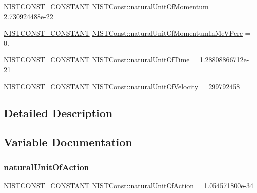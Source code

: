 \begin{DoxyCompactItemize}
\item 
\mbox{\hyperlink{group___n_i_s_t_const-_macros_ga2b0fc1d7452373f816175dd86ce26729}{N\+I\+S\+T\+C\+O\+N\+S\+T\+\_\+\+C\+O\+N\+S\+T\+A\+NT}} \mbox{\hyperlink{group___n_i_s_t_const-_natural_unit_ga020a191050aee0f8de449b86901efcab}{N\+I\+S\+T\+Const\+::natural\+Unit\+Of\+Momentum}} = 2.\+730924488e-\/22
\item 
\mbox{\hyperlink{group___n_i_s_t_const-_macros_ga2b0fc1d7452373f816175dd86ce26729}{N\+I\+S\+T\+C\+O\+N\+S\+T\+\_\+\+C\+O\+N\+S\+T\+A\+NT}} \mbox{\hyperlink{group___n_i_s_t_const-_natural_unit_ga1768d322c0f9342d6fb5a30d1158a6ca}{N\+I\+S\+T\+Const\+::natural\+Unit\+Of\+Momentum\+In\+Me\+V\+Perc}} = 0.
\item 
\mbox{\hyperlink{group___n_i_s_t_const-_macros_ga2b0fc1d7452373f816175dd86ce26729}{N\+I\+S\+T\+C\+O\+N\+S\+T\+\_\+\+C\+O\+N\+S\+T\+A\+NT}} \mbox{\hyperlink{group___n_i_s_t_const-_natural_unit_gab65c3f69b157abb96800734bdc63f25d}{N\+I\+S\+T\+Const\+::natural\+Unit\+Of\+Time}} = 1.\+28808866712e-\/21
\item 
\mbox{\hyperlink{group___n_i_s_t_const-_macros_ga2b0fc1d7452373f816175dd86ce26729}{N\+I\+S\+T\+C\+O\+N\+S\+T\+\_\+\+C\+O\+N\+S\+T\+A\+NT}} \mbox{\hyperlink{group___n_i_s_t_const-_natural_unit_ga89a69b160a137580df146f4407c5290b}{N\+I\+S\+T\+Const\+::natural\+Unit\+Of\+Velocity}} = 299792458
\end{DoxyCompactItemize}


\subsection{Detailed Description}


\subsection{Variable Documentation}
\mbox{\label{group___n_i_s_t_const-_natural_unit_ga52ce10be6f28a0403e43f42445dd5bdb}} 
\subsubsection{\texorpdfstring{natural\+Unit\+Of\+Action}{naturalUnitOfAction}}
{\footnotesize\ttfamily \mbox{\hyperlink{group___n_i_s_t_const-_macros_ga2b0fc1d7452373f816175dd86ce26729}{N\+I\+S\+T\+C\+O\+N\+S\+T\+\_\+\+C\+O\+N\+S\+T\+A\+NT}} N\+I\+S\+T\+Const\+::natural\+Unit\+Of\+Action = 1.\+054571800e-\/34}

